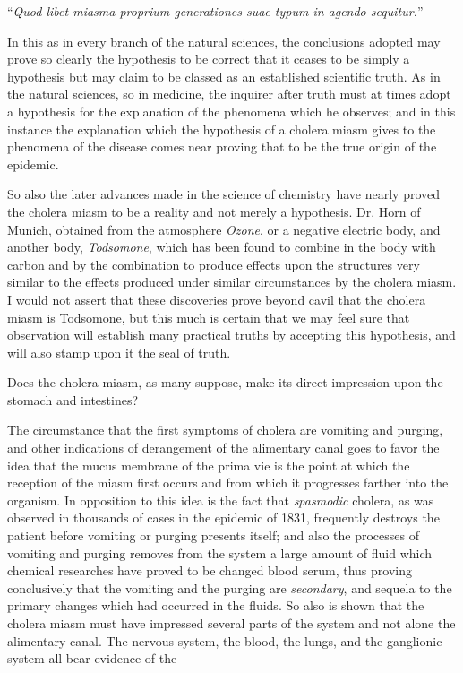 ``\emph{Quod libet miasma proprium generationes suae typum
in agendo sequitur.}''

In this as in every branch of the natural sciences, the conclusions
adopted may prove so clearly the hypothesis to be correct that it ceases
to be simply a hypothesis but may claim to be classed as an established
scientific truth. As in the natural sciences, so in medicine, the inquirer
after truth must at times adopt a hypothesis for the explanation of the
phenomena which he observes; and in this instance the explanation
which the hypothesis of a cholera miasm gives to the phenomena of
the disease comes near proving that to be the true origin of the
epidemic.

So also the later advances made in the science of chemistry have
nearly proved the cholera miasm to be a reality and not merely a
hypothesis. Dr. Horn of Munich, obtained from the atmosphere
\emph{Ozone}, or a negative electric body, and another body, \emph{Todsomone},
which has been found to combine in the body with carbon and by the
combination to produce effects upon the structures very similar to the
effects produced under similar circumstances by the cholera miasm. I
would not assert that these discoveries prove beyond cavil that the
cholera miasm is Todsomone, but this much is certain that we may feel
sure that observation will establish many practical truths by accepting
this hypothesis, and will also stamp upon it the seal of truth.

\vspace{\baselineskip}

Does the cholera miasm, as many suppose, make its direct impression
upon the stomach and intestines?

The circumstance that the first symptoms of cholera are vomiting and
purging, and other indications of derangement of the alimentary canal
goes to favor the idea that the mucus membrane of the prima vie is the
point at which the reception of the miasm first occurs and from which
it progresses farther into the organism. In opposition to this idea is
the fact that \emph{spasmodic} cholera, as was observed in thousands of cases
in the epidemic of 1831, frequently destroys the patient before vomiting
or purging presents itself; and also the processes of vomiting and
purging removes from the system a large amount of fluid which chemical
researches have proved to be changed blood serum, thus proving
conclusively that the vomiting and the purging are \emph{secondary}, and
sequela to the primary changes which had occurred in the fluids. So
also is shown that the cholera miasm must have impressed several parts
of the system and not alone the alimentary canal. The nervous system,
the blood, the lungs, and the ganglionic system all bear evidence of the